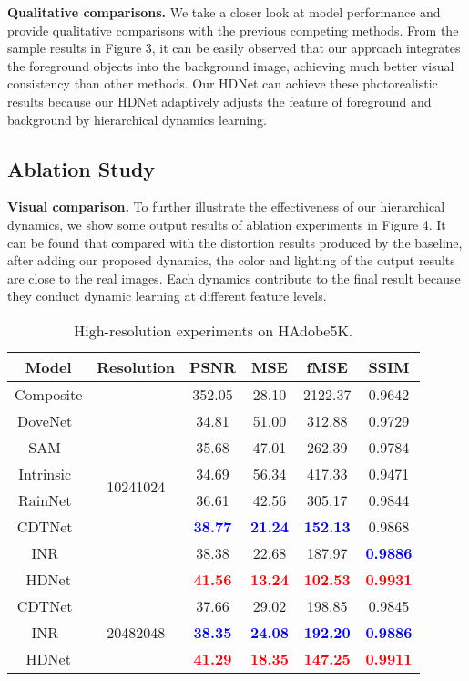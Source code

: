 \documentclass[sigconf]{acmart}
\begin{document}
\noindent
\textbf{Qualitative comparisons.} We take a closer look at model performance and provide qualitative comparisons with the previous competing methods. From the
sample results in Figure 3, it can be easily observed that our approach integrates the foreground objects into
the background image, achieving much better visual consistency than other methods. Our HDNet can achieve these photorealistic results because our HDNet adaptively adjusts the feature of foreground and background by hierarchical dynamics learning.



\subsection{Ablation Study}

\noindent
\textbf{Visual comparison.} To further illustrate the effectiveness of our hierarchical dynamics, we show some output results of ablation experiments in Figure 4. It can be found that compared with the distortion results produced by the baseline, after adding our proposed dynamics, the color and lighting of the output results are close to the real images. Each dynamics contribute to the final result because they conduct dynamic learning at different feature levels. 

\begin{table}[t]
	\centering
	\begin{tabular}{cccccc}
		\toprule
		Model&Resolution&PSNR&MSE&fMSE&SSIM\\\midrule
		Composite&\multirow{8}{*}{10241024}&352.05&28.10&2122.37&0.9642\\
		DoveNet~\cite{DoveNet}&&34.81&51.00& 312.88&0.9729\\
		SAM~\cite{SSAM}&&35.68&47.01&262.39&0.9784\\
		Intrinsic~\cite{GuoZJGZ21}&&34.69&56.34&417.33& 0.9471\\
		RainNet~\cite{RAIN}& &36.61&42.56&305.17& 0.9844\\
		CDTNet~\cite{CDTNet}&&\textbf{\textcolor{blue}{38.77}}&\textbf{\textcolor{blue}{21.24}}& \textbf{\textcolor{blue}{152.13}}&0.9868\\
		INR~\cite{inr}&&38.38&22.68&187.97&\textbf{\textcolor{blue}{0.9886}}\\
		HDNet&&\textbf{\textcolor{red}{41.56}}&\textbf{\textcolor{red}{13.24}}&\textbf{\textcolor{red}{102.53}}&\textbf{\textcolor{red}{0.9931}}\\
		\midrule
		CDTNet~\cite{CDTNet}&\multirow{3}{*}{20482048}&37.66&29.02& 198.85&0.9845\\
		INR~\cite{inr}&&\textbf{\textcolor{blue}{38.35}}&\textbf{\textcolor{blue}{24.08}}&\textbf{\textcolor{blue}{192.20}}&\textbf{\textcolor{blue}{0.9886}}\\
		HDNet&&\textbf{\textcolor{red}{41.29}}&\textbf{\textcolor{red}{18.35}}&\textbf{\textcolor{red}{147.25}}&\textbf{\textcolor{red}{0.9911}}\\
		\bottomrule
	\end{tabular}
	\caption{High-resolution experiments on HAdobe5K.}
\end{table}
\end{document}

